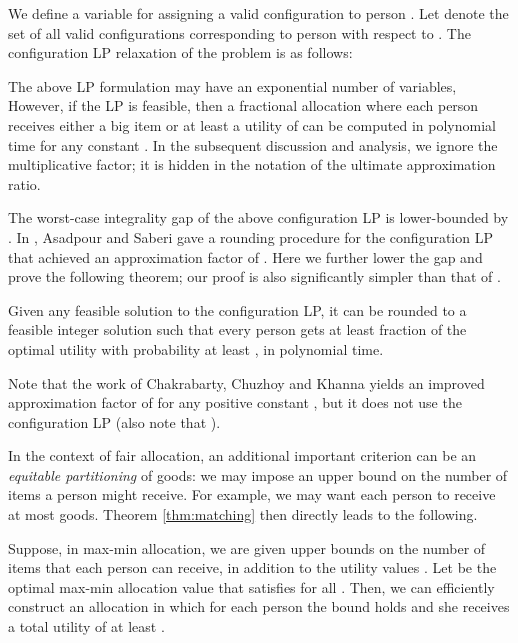 We define a variable  for assigning a valid configuration  to person .
Let  denote the set of all valid configurations corresponding to person  with respect to . The configuration LP relaxation
 of the problem is as follows:



The above LP formulation may have an exponential number of variables, However, if the LP is feasible, then a fractional allocation where each person receives either a big item or at least a utility of  can be computed in
polynomial time for any constant  \cite{bansal:stoc06}.
In the subsequent discussion and analysis, we ignore the multiplicative
 factor; it is hidden in the  notation of
the ultimate approximation ratio.

The worst-case integrality gap of the above configuration LP is
lower-bounded by  \cite{bansal:stoc06}.
In \cite{asadpour:stoc07}, Asadpour and Saberi
gave a rounding procedure for the configuration LP that achieved an approximation factor of . Here we further lower
the gap and prove the following theorem;  our proof is also
significantly simpler than that of \cite{asadpour:stoc07}.


\begin{theorem}
\label{thm:santa1}
Given any feasible solution to the configuration LP, it can be rounded to a feasible integer solution such that every person gets  at least  fraction of the optimal utility with probability at least , in polynomial time.
\end{theorem}


Note that the work of Chakrabarty, Chuzhoy and Khanna \cite{Chuzhoy09}
yields an improved approximation factor of 
for any positive constant
, but it does not use the configuration LP
(also note that ).


In the context of fair allocation, an additional important criterion can be
an \emph{equitable partitioning} of goods: we may impose an upper
bound on the number of items a person might receive. For example,
we may want each person to receive at most  goods. Theorem \ref{thm:matching} then directly leads to the following.
\begin{theorem}
\label{thm:santa2}
Suppose, in max-min allocation, we are given upper bounds  on the
number of items that each person  can receive, in addition to the
 utility values . Let  be the optimal max-min allocation value
that satisfies  for all . Then, we can efficiently construct an allocation
in which for each person  the bound  holds and she receives a total
utility of at least .
\end{theorem}


